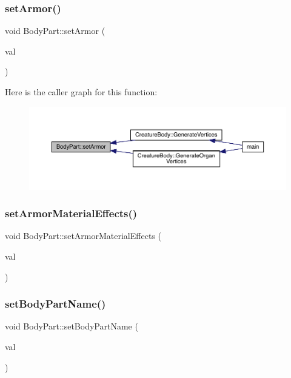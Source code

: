 \subsubsection{\texorpdfstring{set\+Armor()}{setArmor()}}
{\footnotesize\ttfamily void Body\+Part\+::set\+Armor (\begin{DoxyParamCaption}\item[{\mbox{\hyperlink{class_armor}{Armor}}}]{val }\end{DoxyParamCaption})}

Here is the caller graph for this function\+:
\nopagebreak
\begin{figure}[H]
\begin{center}
\leavevmode
\includegraphics[width=350pt]{class_body_part_a089afe1bbd06d3fc84a9870ec173883c_icgraph}
\end{center}
\end{figure}
\mbox{\label{class_body_part_a042e07259ce197a1077fe36660332a33}} 
\subsubsection{\texorpdfstring{set\+Armor\+Material\+Effects()}{setArmorMaterialEffects()}}
{\footnotesize\ttfamily void Body\+Part\+::set\+Armor\+Material\+Effects (\begin{DoxyParamCaption}\item[{\mbox{\hyperlink{struct_applied_force_effect}{Applied\+Force\+Effect}}}]{val }\end{DoxyParamCaption})}

\mbox{\label{class_body_part_a9d3d014b8d645dbbf1ef6c14335ef940}} 
\subsubsection{\texorpdfstring{set\+Body\+Part\+Name()}{setBodyPartName()}}
{\footnotesize\ttfamily void Body\+Part\+::set\+Body\+Part\+Name (\begin{DoxyParamCaption}\item[{std\+::string}]{val }\end{DoxyParamCaption})}

